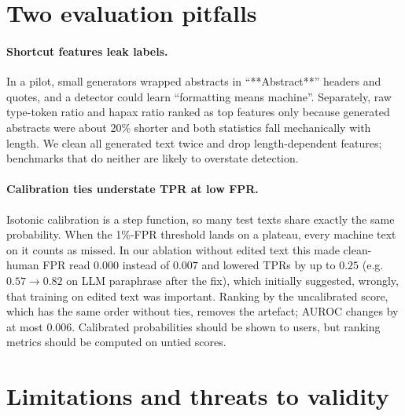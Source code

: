 \documentclass[11pt]{article}
\begin{document}
\section{Two evaluation pitfalls}
\label{sec:pitfalls}

\paragraph{Shortcut features leak labels.}
In a pilot, small generators wrapped abstracts in ``**Abstract**'' headers and quotes, and a detector could learn ``formatting means machine''.
Separately, raw type-token ratio and hapax ratio ranked as top features only because generated abstracts were about 20\% shorter and both statistics fall mechanically with length.
We clean all generated text twice and drop length-dependent features; benchmarks that do neither are likely to overstate detection.

\paragraph{Calibration ties understate TPR at low FPR.}
Isotonic calibration is a step function, so many test texts share exactly the same probability.
When the 1\%-FPR threshold lands on a plateau, every machine text on it counts as missed.
In our ablation without edited text this made clean-human FPR read $0.000$ instead of $0.007$ and lowered TPRs by up to $0.25$ (e.g.\ $0.57 \rightarrow 0.82$ on LLM paraphrase after the fix), which initially suggested, wrongly, that training on edited text was important.
Ranking by the uncalibrated score, which has the same order without ties, removes the artefact; AUROC changes by at most $0.006$.
Calibrated probabilities should be shown to users, but ranking metrics should be computed on untied scores.

\section{Limitations and threats to validity}
\end{document}
